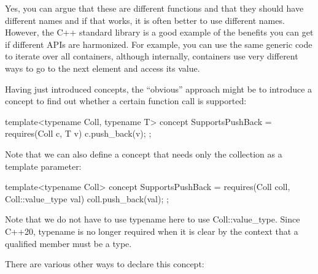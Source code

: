 Yes, you can argue that these are different functions and that they should have different names and if that works, it is often better to use different names. However, the C++ standard library is a good example of the benefits you can get if different APIs are harmonized. For example, you can use the same generic code to iterate over all containers, although internally, containers use very different ways to go to the next element and access its value.


Having just introduced concepts, the “obvious” approach might be to introduce a concept to find out whether a certain function call is supported:

\begin{cpp}
template<typename Coll, typename T>
concept SupportsPushBack = requires(Coll c, T v) {
	c.push_back(v);
};
\end{cpp}

Note that we can also define a concept that needs only the collection as a template parameter:

\begin{cpp}
template<typename Coll>
concept SupportsPushBack = requires(Coll coll, Coll::value_type val) {
	coll.push_back(val);
};
\end{cpp}

Note that we do not have to use typename here to use Coll::value\_type. Since C++20, typename is no longer required when it is clear by the context that a qualified member must be a type.

There are various other ways to declare this concept:

